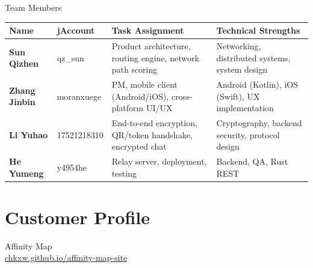 \documentclass[xcolor=table,dvipsnames,svgnames,aspectratio=169]{beamer}
\begin{document}
\begin{frame}{Team Members }

\vspace{-0.3em}
\small
\renewcommand{\arraystretch}{1.3}
\begin{tabularx}{\textwidth}{@{} >{\bfseries}l l X X @{}}
  \toprule
  Name & jAccount & Task Assignment & Technical Strengths \\
  \midrule
  Sun Qizhen   & qz\_sun       & Product architecture, routing engine, network path scoring & Networking, distributed systems, system design \\
  Zhang Jinbin & moranxuege   & PM, mobile client (Android/iOS), cross-platform UI/UX & Android (Kotlin), iOS (Swift), UX implementation \\
  Li Yuhao     & 17521218310  & End-to-end encryption, QR/token handshake, encrypted chat & Cryptography, backend security, protocol design \\
  He Yumeng    & y4954he      & Relay server, deployment, testing & Backend, QA, Rust REST \\
  \bottomrule
\end{tabularx}

\end{frame}

\section{Customer Profile}
 
\begin{frame}{Affinity Map}
  \vfill
  \centering
  {\LARGE\faLink}\\[1.2em]
  \href{https://chkxw.github.io/affinity-map-site/}%
       {\large\ttfamily chkxw.github.io/affinity-map-site}
  \vfill
\end{frame}
 
\end{document}
